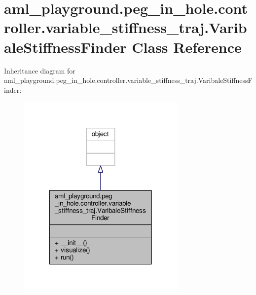 \hypertarget{classaml__playground_1_1peg__in__hole_1_1controller_1_1variable__stiffness__traj_1_1_varibale_stiffness_finder}{\section{aml\-\_\-playground.\-peg\-\_\-in\-\_\-hole.\-controller.\-variable\-\_\-stiffness\-\_\-traj.\-Varibale\-Stiffness\-Finder Class Reference}
\label{classaml__playground_1_1peg__in__hole_1_1controller_1_1variable__stiffness__traj_1_1_varibale_stiffness_finder}
}


Inheritance diagram for aml\-\_\-playground.\-peg\-\_\-in\-\_\-hole.\-controller.\-variable\-\_\-stiffness\-\_\-traj.\-Varibale\-Stiffness\-Finder\-:\nopagebreak
\begin{figure}[H]
\begin{center}
\leavevmode
\includegraphics[width=234pt]{classaml__playground_1_1peg__in__hole_1_1controller_1_1variable__stiffness__traj_1_1_varibale_stiffness_finder__inherit__graph}
\end{center}
\end{figure}


